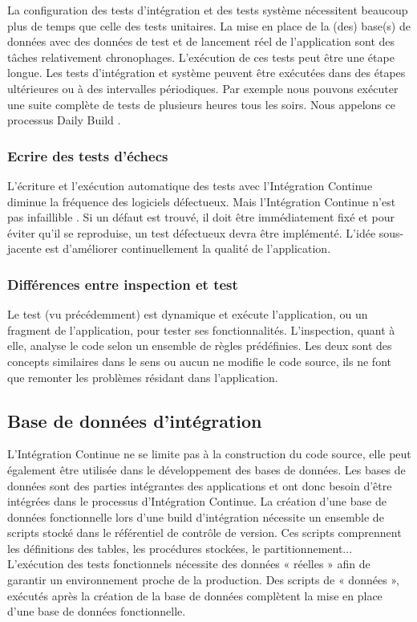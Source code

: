       La configuration des tests d'intégration et des tests système nécessitent beaucoup plus de temps que celle des tests unitaires. La mise en place de la (des) base(s) de données avec des données de test et de lancement réel de l’application sont des tâches relativement chronophages. L’exécution de ces tests peut être une étape longue. Les tests d’intégration et système peuvent être exécutées dans des étapes ultérieures ou à des intervalles périodiques. Par exemple nous pouvons exécuter une suite complète de tests de plusieurs heures tous les soirs. Nous appelons ce processus Daily Build \cite{McC96}.

      \subsubsection{Ecrire des tests d’échecs}
      L’écriture et l’exécution automatique des tests avec l’Intégration Continue diminue la fréquence des logiciels défectueux. Mais l’Intégration Continue n’est pas infaillible \cite{Duv07}. Si un défaut est trouvé, il doit être immédiatement fixé et pour éviter qu'il se reproduise, un test défectueux devra être implémenté. L'idée sous-jacente est d’améliorer continuellement la qualité de l’application.

      \subsubsection{Différences entre inspection et test}
      Le test (vu précédemment) est dynamique et exécute l’application, ou un fragment de l’application, pour tester ses fonctionnalités. L’inspection, quant à elle, analyse le code selon un ensemble de règles prédéfinies. Les deux sont des concepts similaires dans le sens ou aucun ne modifie le code source, ils ne font que remonter les problèmes résidant dans l’application.

    \subsection{Base de données d’intégration}
    L’Intégration Continue ne se limite pas à la construction du code source, elle peut également être utilisée dans le développement des bases de données. Les bases de données sont des parties intégrantes des applications et ont donc besoin d’être intégrées dans le processus d’Intégration Continue. La création d’une base de données fonctionnelle lors d’une build d’intégration nécessite un ensemble de scripts stocké dans le référentiel de contrôle de version. Ces scripts comprennent les définitions des tables, les procédures stockées, le partitionnement... L’exécution des tests fonctionnels nécessite des données « réelles » afin de garantir un environnement proche de la production. Des scripts de « données », exécutés après la création de la base de données complètent la mise en place d’une base de données fonctionnelle.\\


